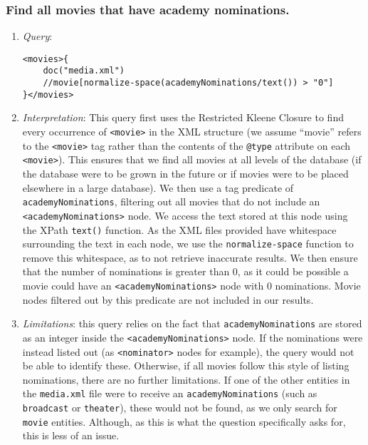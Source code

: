 \documentclass[11pt]{article}
\begin{document}
\subsubsection{Find all movies that have academy nominations.}

\begin{enumerate}
\item \textit{Query}:
\begin{small}
\begin{verbatim}
<movies>{
    doc("media.xml")
    //movie[normalize-space(academyNominations/text()) > "0"]
}</movies>
\end{verbatim}
\end{small}
\item \textit{Interpretation}: This query first uses the Restricted Kleene Closure to find every occurrence of \texttt{<movie>} in the XML structure (we assume ``movie'' refers to the \texttt{<movie>} tag rather than the contents of the \texttt{@type} attribute on each \texttt{<movie>}). This ensures that we find all movies at all levels of the database (if the database were to be grown in the future or if movies were to be placed elsewhere in a large database). We then use a tag predicate of \texttt{academyNominations}, filtering out all movies that do not include an \texttt{<academyNominations>} node. We access the text stored at this node using the XPath \texttt{text()} function. As the XML files provided have whitespace surrounding the text in each node, we use the \texttt{normalize-space} function to remove this whitespace, as to not retrieve inaccurate results. We then ensure that the number of nominations is greater than 0, as it could be possible a movie could have an \texttt{<academyNominations>} node with 0 nominations. Movie nodes filtered out by this predicate are not included in our results.
\item \textit{Limitations}: this query relies on the fact that \texttt{academyNominations} are stored as an integer inside the \texttt{<academyNominations>} node. If the nominations were instead listed out (as \texttt{<nominator>} nodes for example), the query would not be able to identify these. Otherwise, if all movies follow this style of listing nominations, there are no further limitations. If one of the other entities in the \texttt{media.xml} file were to receive an \texttt{academyNominations} (such as \texttt{broadcast} or \texttt{theater}), these would not be found, as we only search for \texttt{movie} entities. Although, as this is what the question specifically asks for, this is less of an issue. 


\end{enumerate}
\end{document}
